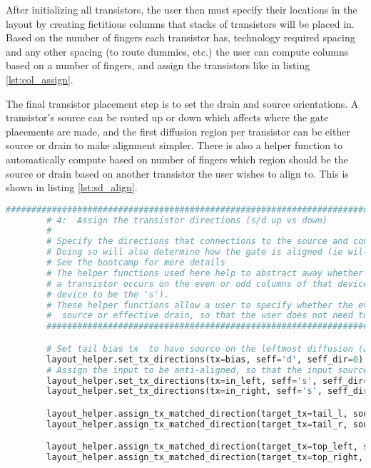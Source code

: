 After initializing all transistors, the user then must specify their locations in the layout by creating fictitious columns that stacks of transistors will be placed in. Based on the number of fingers each transistor has, technology required spacing and any other spacing (to route dummies, etc.) the user can compute columns based on a number of fingers, and assign the transistors like in listing \ref{lst:col_assign}.

The final transistor placement step is to set the drain and source orientations. A transistor's source can be routed up or down which affects where the gate placements are made, and the first diffusion region per transistor can be either source or drain to make alignment simpler. There is also a helper function to automatically compute based on number of fingers which region should be the source or drain based on another transistor the user wishes to align to. This is shown in listing \ref{lst:sd_align}.
\begin{lstlisting}[language=Python, caption=Determining transistor drain/source configurations, label={lst:sd_align}, float]
	################################################################################
        # 4:  Assign the transistor directions (s/d up vs down)
        #
        # Specify the directions that connections to the source and connections to the drain will go (up vs down)
        # Doing so will also determine how the gate is aligned (ie will it be aligned to the source or drain)
        # See the bootcamp for more details
        # The helper functions used here help to abstract away whether the intended source/drain diffusion region of
        # a transistor occurs on the even or odd columns of that device (BAG always considers the even columns of a
        # device to be the 's').
        # These helper functions allow a user to specify whether the even columns should be the transistors effective
        #  source or effective drain, so that the user does not need to worry about BAG's notation.
        ################################################################################

        # Set tail bias tx  to have source on the leftmost diffusion (arbitrary) and source going down
        layout_helper.set_tx_directions(tx=bias, seff='d', seff_dir=0)
        # Assign the input to be anti-aligned, so that the input source and tail drain are vertically aligned
        layout_helper.set_tx_directions(tx=in_left, seff='s', seff_dir=0)
        layout_helper.set_tx_directions(tx=in_right, seff='s', seff_dir=0)

        layout_helper.assign_tx_matched_direction(target_tx=tail_l, source_tx=in_left, seff_dir=0, aligned=False)
        layout_helper.assign_tx_matched_direction(target_tx=tail_r, source_tx=in_right, seff_dir=0, aligned=False)

        layout_helper.assign_tx_matched_direction(target_tx=top_left, source_tx=in_left, seff_dir=2)
        layout_helper.assign_tx_matched_direction(target_tx=top_right, source_tx=in_right, seff_dir=2)
\end{lstlisting}
